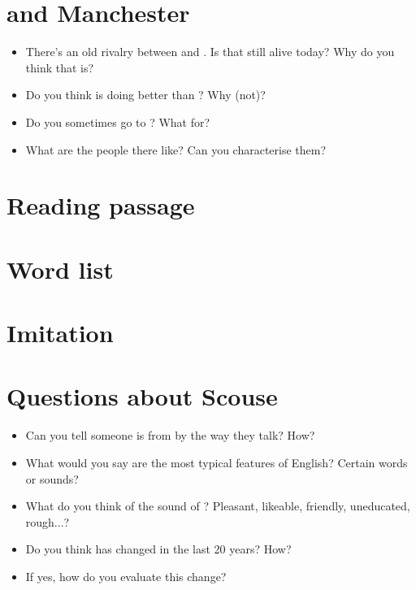 	\section*{ and Manchester}
	\begin{multicols}{2}
		\begin{itemize}
			\item There's an old rivalry between  and . Is that still alive today? Why do you think that is?
			\item Do you think  is doing better than ? Why (not)?
			\item Do you sometimes go to ? What for?
			\item What are the people there like? Can you characterise them?
		\end{itemize}
	\end{multicols}
	
	\section*{Reading passage}

	\section*{Word list}

	\section*{Imitation}

	\section*{Questions about Scouse}
	\begin{multicols}{2}
		\begin{itemize}
			\item Can you tell someone is from  by the way they talk? How?
			\item What would you say are the most typical features of  English? Certain words or sounds?
			\item What do you think of the sound of ? Pleasant, likeable, friendly, uneducated, rough...?
			\item Do you think  has changed in the last 20 years? How? 
			\item If yes, how do you evaluate this change?
		\end{itemize}		
	\end{multicols}